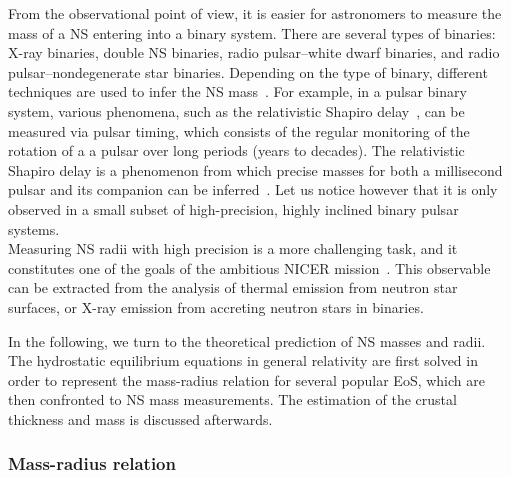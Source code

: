 From the observational point of view, it is easier for astronomers to measure 
the mass of a NS entering into a binary system. There are several types of
binaries: X-ray binaries, double NS binaries, radio pulsar--white dwarf 
binaries, and radio pulsar--nondegenerate star binaries. Depending on the type 
of binary, different techniques are used to infer the NS 
mass~\cite{Haensel2007}.
For example, in a pulsar binary system, various phenomena, such as the 
relativistic Shapiro delay~\cite{Shapiro1964}, can be measured via pulsar 
timing, which consists of the regular monitoring of the rotation of a a pulsar 
over long periods (years to decades). The relativistic Shapiro delay is a 
phenomenon from which precise masses for both a millisecond pulsar and its 
companion can be inferred~\cite{Demorest2010,Cromartie2020}. Let us notice 
however that it is only observed in a small subset of high-precision, highly 
inclined binary pulsar systems.\\
Measuring NS radii with high precision is a more challenging task, and it
constitutes one of the goals of the ambitious NICER mission~\cite{NICER}. This
observable can be extracted from the analysis of thermal emission from neutron 
star surfaces, or X-ray emission from accreting neutron stars in binaries.

In the following, we turn to the theoretical prediction of NS masses and radii. 
The hydrostatic equilibrium equations in general relativity are first solved in 
order to represent the mass-radius relation for several popular EoS, which are
then confronted to NS mass measurements. The estimation of the crustal 
thickness and mass is discussed afterwards.

\subsubsection{Mass-radius relation}

